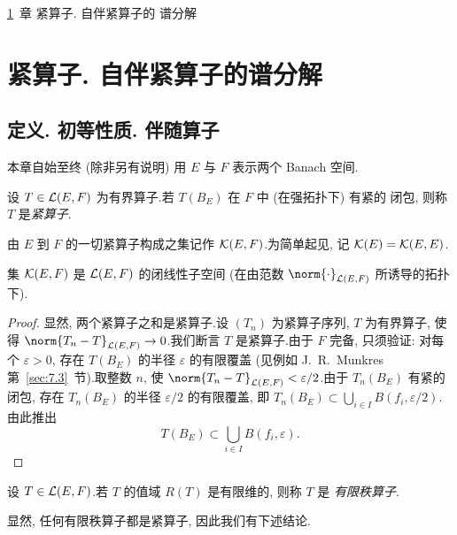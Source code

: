 \ref{chap:6}~章 
紧算子. 自伴紧算子的
谱分解

\chapter{紧算子. 自伴紧算子的谱分解}
\label{chap:6}

\section{定义. 初等性质. 伴随算子}
\label{sec:6.1}

本章自始至终 (除非另有说明) 用 $E$ 与 $F$ 表示两个 Banach 空间.

\begin{definition}
设 $T\in\mathcal{L}(E,F)$ 为有界算子.若 $T(B_E)$ 在 $F$ 中 (在强拓扑下) 有紧的
闭包, 则称 $T$ 是\emph{紧算子}.
\end{definition}

由 $E$ 到 $F$ 的一切紧算子构成之集记作 $\mathcal{K}(E,F)$.为简单起见, 记
$\mathcal{K}(E)=\mathcal{K}(E,E)$.

\begin{theorem}
\label{thm:6.1}
集 $\mathcal{K}(E,F)$ 是 $\mathcal{L}(E,F)$ 的闭线性子空间 (在由范数
$\norm{\cdot}_{\LL(E,F)}$ 所诱导的拓扑下).
\end{theorem}

\begin{proof}
显然, 两个紧算子之和是紧算子.设 $(T_n)$ 为紧算子序列, $T$ 为有界算子,
使得 $\norm{T_n-T}_{\LL(E,F)}\to0$.我们断言 $T$ 是紧算子.由于 $F$ 完备,
只须验证: 对每个 $\varepsilon>0$, 存在 $T(B_E)$ 的半径 $\varepsilon$ 的有限覆盖
(见例如 J.~R.~Munkres  第~\ref{sec:7.3}~节).取整数 $n$, 使
$\norm{T_n-T}_{\LL(E,F)}<\varepsilon/2$.由于 $T_n(B_E)$ 有紧的闭包, 存在
$T_n(B_E)$ 的半径 $\varepsilon/2$ 的有限覆盖, 即
$T_n(B_E)\subset\bigcup_{i\in I}B(f_i,\varepsilon/2)$.由此推出
\begin{equation*}
T(B_E)\subset\bigcup_{i\in I}B(f_i,\varepsilon).
\end{equation*}
\end{proof}

\begin{definition}
设 $T\in\mathcal{L}(E,F)$.若 $T$ 的值域 $R(T)$ 是有限维的, 则称 $T$ 是
\emph{有限秩算子}.
\end{definition}

显然, 任何有限秩算子都是紧算子, 因此我们有下述结论.

